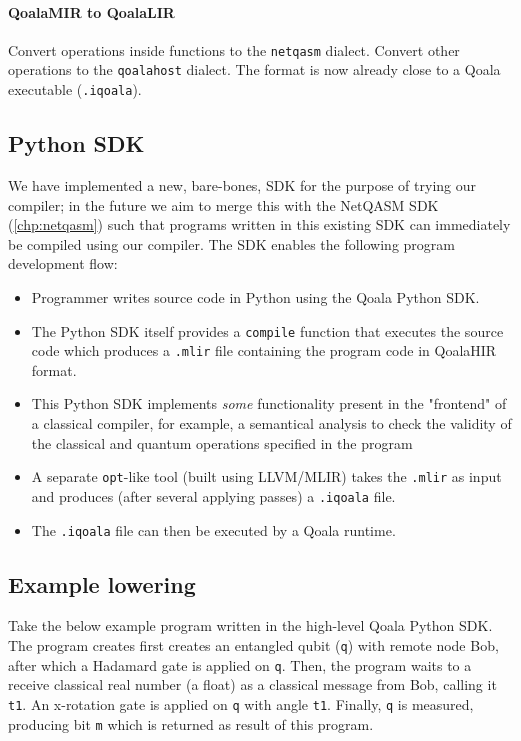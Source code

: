 \paragraph{QoalaMIR to QoalaLIR}
Convert operations inside functions to the \texttt{netqasm} dialect.
Convert other operations to the \texttt{qoalahost} dialect.
The format is now already close to a Qoala executable (\texttt{.iqoala}).

\subsection{Python SDK}
We have implemented a new, bare-bones, SDK for the purpose of trying our compiler; in the future we aim to merge this with the NetQASM SDK (\cref{chp:netqasm}) such that programs written in this existing SDK can immediately be compiled using our compiler.
The SDK enables the following program development flow:

\begin{itemize}
\item Programmer writes source code in Python using the Qoala Python SDK.
\item The Python SDK itself provides a \texttt{compile} function that executes the source code
  which produces a \texttt{.mlir} file containing the program code in QoalaHIR format.
\item This Python SDK implements \textit{some} functionality present in the "frontend" of a classical
  compiler, for example, a semantical analysis to check the validity of the classical and
  quantum operations specified in the program 
\item A separate \texttt{opt}-like tool (built using LLVM/MLIR) takes the \texttt{.mlir} as input and produces
  (after several applying passes) a \texttt{.iqoala} file.
\item The \texttt{.iqoala} file can then be executed by a Qoala runtime.
\end{itemize}


\subsection{Example lowering}

Take the below example program written in the high-level Qoala Python SDK.
The program creates first creates an entangled qubit (\texttt{q}) with remote node Bob, after which a Hadamard gate is applied on \texttt{q}.
Then, the program waits to a receive classical real number (a float) as a classical message from Bob, calling it \texttt{t1}.
An x-rotation gate is applied on \texttt{q} with angle \texttt{t1}.
Finally, \texttt{q} is measured, producing bit \texttt{m} which is returned as result of this program.
\newpage

